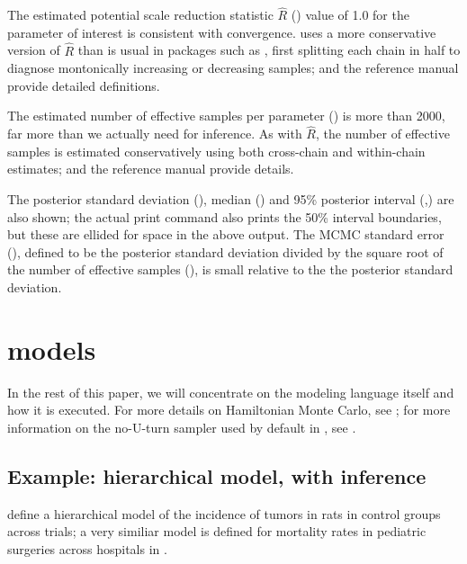 \documentclass[article]{jss}
\begin{document}
%
The estimated potential scale reduction statistic $\hat{R}$
() value of 1.0 for the parameter of interest 
is consistent with convergence.   uses a more
conservative version of $\hat{R}$ than is usual in packages such as
, first splitting each chain in half to diagnose
montonically increasing or decreasing samples; \citep{GelmanEtAl:2013}
and the reference manual provide detailed definitions.

The estimated number of effective samples per parameter
() is more than 2000, far more than we actually need for
inference.  As with $\hat{R}$, the number of effective samples is
estimated conservatively using both cross-chain and within-chain
estimates; \citep{GelmanEtAl:2013} and the reference manual provide
details.

The posterior standard deviation (), median () and
95\% posterior interval (,) are also shown;
the actual print command also prints the 50\% interval boundaries, but
these are ellided for space in the above output.  The MCMC standard
error (), defined to be the posterior standard deviation
divided by the square root of the number of effective samples
(), is small relative to the the posterior
standard deviation.


\section[Stan models]{ models}

In the rest of this paper, we will concentrate on the modeling
language itself and how it is executed.  For more details on
Hamiltonian Monte Carlo, see \citep{Neal:2011}; for more information
on the no-U-turn sampler used by default in , see
\citep{Hoffman-Gelman:2011}.

\subsection{Example: hierarchical model, with inference}

\cite[Section 5.1]{GelmanEtAl:2013} define a hierarchical model of the
incidence of tumors in rats in control groups across trials; a very
similiar model is defined for mortality rates in pediatric surgeries
across hospitals in \citep[Examples, Volume 1]{LunnEtAl:2000}.%
\end{document}
